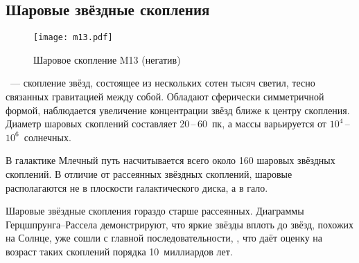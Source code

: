 \subsection{Шаровые звёздные скопления}

\begin{wrapfigure}[10]{r}{0.3\tw}
    \vspace{-1pc}
    \centering
    \texttt{[image: m13.pdf]}
    \caption{Шаровое скопление M13 (негатив)}
\end{wrapfigure}
~--- скопление звёзд, состоящее из нескольких сотен тысяч светил, тесно связанных гравитацией между собой. Обладают сферически симметричной формой, наблюдается увеличение концентрации звёзд ближе к центру скопления. Диаметр шаровых скоплений составляет 20\,--\,60~пк, а массы варьируется от $10^4$\,--\,$10^6$~солнечных. 

В галактике Млечный путь насчитывается всего около 160 шаровых звёздных скоплений. В отличие от рассеянных звёздных скоплений, шаровые располагаются не в плоскости галактического диска, а в гало.

Шаровые звёздные скопления гораздо старше рассеянных. Диаграммы Герцшпрунга--Рассела демонстрируют, что яркие звёзды вплоть до звёзд, похожих на Солнце, уже сошли с главной последовательности, , что даёт оценку на возраст таких скоплений порядка 10~миллиардов лет.


